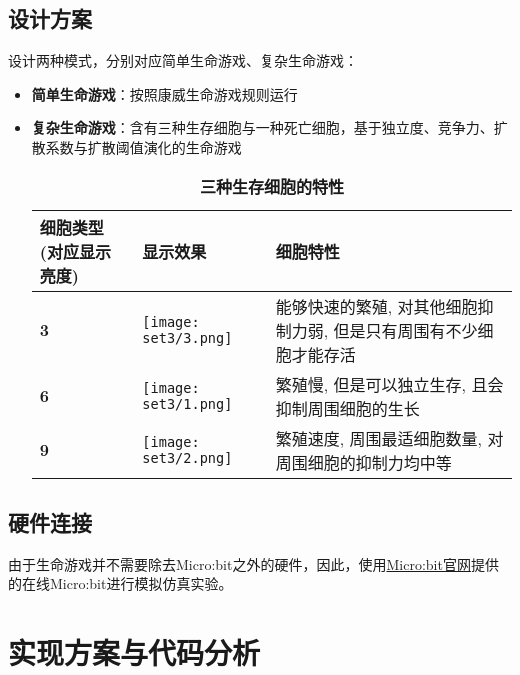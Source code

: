 \documentclass[11pt]{article}
\begin{document}
\subsection{设计方案}
\hspace{2em} 设计两种模式，分别对应简单生命游戏、复杂生命游戏：
\begin{itemize}
    \item \textbf{简单生命游戏}：按照康威生命游戏规则运行
    \item \textbf{复杂生命游戏}：含有三种生存细胞与一种死亡细胞，基于独立度、竞争力、扩散系数与扩散阈值演化的生命游戏
    \\
    \begin{table}[h] %
      \centering %
      \caption{\textbf{三种生存细胞的特性}} %
      \begin{tabularx}{\linewidth}{X X m{6cm}} %
            \hline \centering 细胞类型(对应显示亮度) & \centering 显示效果 & 细胞特性 \\
            \hline \centering \textbf{3} & \centering \begin{adjustbox}{valign=m}
                \texttt{[image: set3/3.png]}
                \end{adjustbox} &  能够快速的繁殖, 对其他细胞抑制力弱, 但是只有周围有不少细胞才能存活\\
            \hline \centering \textbf{6} & \centering  \begin{adjustbox}{valign=m}
                \texttt{[image: set3/1.png]}
                \end{adjustbox}  & 繁殖慢, 但是可以独立生存, 且会抑制周围细胞的生长 \\
            \hline \centering \textbf{9} & \centering \begin{adjustbox}{valign=m}
                \texttt{[image: set3/2.png]}
                \end{adjustbox}  & 繁殖速度, 周围最适细胞数量, 对周围细胞的抑制力均中等  \\
            \hline
      \end{tabularx}
    \end{table}
\end{itemize}
\subsection{硬件连接}
\hspace{2em} 由于生命游戏并不需要除去Micro:bit之外的硬件，因此，使用\href{https://python.microbit.org/v/3}{Micro:bit官网}提供的在线Micro:bit进行模拟仿真实验。
    \hypertarget{ux5b9eux73b0ux65b9ux6848ux4e0eux4ee3ux7801ux5206ux6790}{%
\section{实现方案与代码分析}\label{ux5b9eux73b0ux65b9ux6848ux4e0eux4ee3ux7801ux5206ux6790}}
\end{document}
